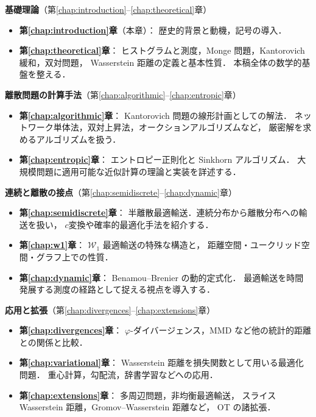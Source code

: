 \noindent
\textbf{基礎理論}（第\ref{chap:introduction}--\ref{chap:theoretical}章）
\begin{itemize}
  \item \textbf{第\ref{chap:introduction}章}（本章）：
    歴史的背景と動機，記号の導入．
  \item \textbf{第\ref{chap:theoretical}章}：
    ヒストグラムと測度，Monge 問題，Kantorovich 緩和，双対問題，
    Wasserstein 距離の定義と基本性質．
    本稿全体の数学的基盤を整える．
\end{itemize}

\medskip

\noindent
\textbf{離散問題の計算手法}（第\ref{chap:algorithmic}--\ref{chap:entropic}章）
\begin{itemize}
  \item \textbf{第\ref{chap:algorithmic}章}：
    Kantorovich 問題の線形計画としての解法．
    ネットワーク単体法，双対上昇法，オークションアルゴリズムなど，
    厳密解を求めるアルゴリズムを扱う．
  \item \textbf{第\ref{chap:entropic}章}：
    エントロピー正則化と Sinkhorn アルゴリズム．
    大規模問題に適用可能な近似計算の理論と実装を詳述する．
\end{itemize}

\medskip

\noindent
\textbf{連続と離散の接点}（第\ref{chap:semidiscrete}--\ref{chap:dynamic}章）
\begin{itemize}
  \item \textbf{第\ref{chap:semidiscrete}章}：
    半離散最適輸送．連続分布から離散分布への輸送を扱い，
    $c$変換や確率的最適化手法を紹介する．
  \item \textbf{第\ref{chap:w1}章}：
    $\mathcal{W}_1$ 最適輸送の特殊な構造と，
    距離空間・ユークリッド空間・グラフ上での性質．
  \item \textbf{第\ref{chap:dynamic}章}：
    Benamou--Brenier の動的定式化．
    最適輸送を時間発展する測度の経路として捉える視点を導入する．
\end{itemize}

\medskip

\noindent
\textbf{応用と拡張}（第\ref{chap:divergences}--\ref{chap:extensions}章）
\begin{itemize}
  \item \textbf{第\ref{chap:divergences}章}：
    $\varphi$-ダイバージェンス，MMD など他の統計的距離との関係と比較．
  \item \textbf{第\ref{chap:variational}章}：
    Wasserstein 距離を損失関数として用いる最適化問題．
    重心計算，勾配流，辞書学習などへの応用．
  \item \textbf{第\ref{chap:extensions}章}：
    多周辺問題，非均衡最適輸送，
    スライス Wasserstein 距離，Gromov--Wasserstein 距離など，
    OT の諸拡張．
\end{itemize}

